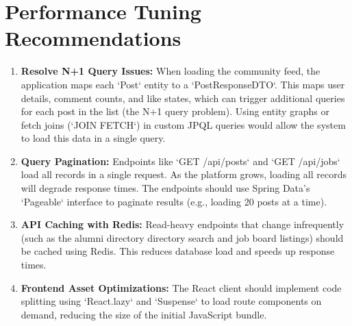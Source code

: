 \section{Performance Tuning Recommendations}
\begin{enumerate}
    \item \textbf{Resolve N+1 Query Issues:} When loading the community feed, the application maps each `Post` entity to a `PostResponseDTO`. This maps user details, comment counts, and like states, which can trigger additional queries for each post in the list (the N+1 query problem). Using entity graphs or fetch joins (`JOIN FETCH`) in custom JPQL queries would allow the system to load this data in a single query.
    \item \textbf{Query Pagination:} Endpoints like `GET /api/posts` and `GET /api/jobs` load all records in a single request. As the platform grows, loading all records will degrade response times. The endpoints should use Spring Data's `Pageable` interface to paginate results (e.g., loading 20 posts at a time).
    \item \textbf{API Caching with Redis:} Read-heavy endpoints that change infrequently (such as the alumni directory directory search and job board listings) should be cached using Redis. This reduces database load and speeds up response times.
    \item \textbf{Frontend Asset Optimizations:} The React client should implement code splitting using `React.lazy` and `Suspense` to load route components on demand, reducing the size of the initial JavaScript bundle.
\end{enumerate}
